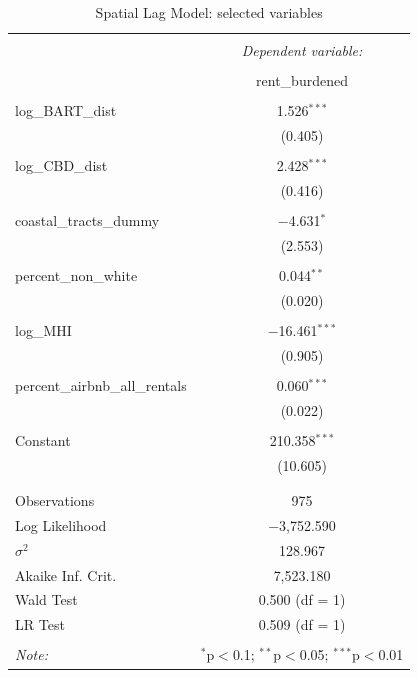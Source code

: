 \documentclass[10pt, letterpaper]{amsart}
\begin{document}
\begin{table}[!htbp] \centering 
  \caption{Spatial Lag Model: selected variables} 
  \label{} 
  \begin{tabular}{@{\extracolsep{5pt}}lc} 
    \\[-1.8ex]\hline 
    \hline \\[-1.8ex] 
    & \multicolumn{1}{c}{\textit{Dependent variable:}} \\ 
    \cline{2-2} 
    \\[-1.8ex] & rent\_burdened \\ 
    \hline \\[-1.8ex] 
    log\_BART\_dist & 1.526$^{***}$ \\ 
    & (0.405) \\ 
    & \\ 
    log\_CBD\_dist & 2.428$^{***}$ \\ 
    & (0.416) \\ 
    & \\ 
    coastal\_tracts\_dummy & $-$4.631$^{*}$ \\ 
    & (2.553) \\ 
    & \\ 
    percent\_non\_white & 0.044$^{**}$ \\ 
    & (0.020) \\ 
    & \\ 
    log\_MHI & $-$16.461$^{***}$ \\ 
    & (0.905) \\ 
    & \\ 
    percent\_airbnb\_all\_rentals & 0.060$^{***}$ \\ 
    & (0.022) \\ 
    & \\ 
    Constant & 210.358$^{***}$ \\ 
    & (10.605) \\ 
    & \\ 
    \hline \\[-1.8ex] 
    Observations & 975 \\ 
    Log Likelihood & $-$3,752.590 \\ 
    $\sigma^{2}$ & 128.967 \\ 
    Akaike Inf. Crit. & 7,523.180 \\ 
    Wald Test & 0.500 (df = 1) \\ 
    LR Test & 0.509 (df = 1) \\ 
    \hline 
    \hline \\[-1.8ex] 
    \textit{Note:}  & \multicolumn{1}{r}{$^{*}$p$<$0.1; $^{**}$p$<$0.05; $^{***}$p$<$0.01} \\ 
  \end{tabular} 
\end{table}
\end{document}

